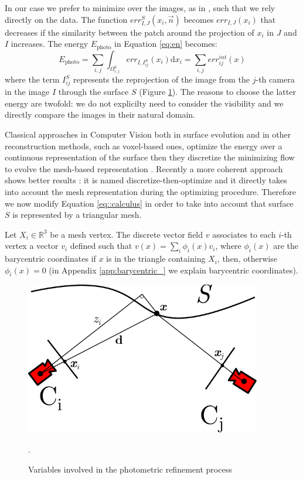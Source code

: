 In our case we prefer to minimize  over the images, as in \cite{pons2007multi}, such that we rely directly on the data.
The function $err^S_{I, J}(x_i,\overrightarrow{n})$ becomes 
$err_{I, J}(x_i)$ that decreases if the similarity between the patch around the projection of $x_i$ in  $J$ and $I$ increases.
The energy $E_{\textrm{photo}}$ in Equation \eqref{eq:en} becomes:
\begin{equation}
\label{eq:energy_photo}
  E_{\textrm{photo}} = \sum_{i,j}\int_{\Omega^{\textrm{S}}_{i,j}} err_{I, I_{ij}^{\mathit{S}}}(x_i)\textrm{d}x_i = \sum_{i,j} \mathit{err}^{int}_{ij}(x)
\end{equation}
where the term $I_{ij}^{\mathit{S}}$ represents the reprojection of the image from the $j$-th camera in the image $I$ through the surface $\mathit{S}$
(Figure \ref{fig:cameraproj}).
The reasons to choose the latter energy are twofold: we do not explicilty need to consider the visibility and we directly compare the images in their natural domain.

Classical approaches in Computer Vision both in surface evolution and in other reconstruction methods, such as voxel-based ones, optimize the energy over a continuous representation of the surface then they discretize the minimizing flow to evolve the mesh-based representation \cite{pons2007multi,faugeras2002variational}. Recently a more coherent approach shows better results \cite{vu_et_al_2012,delaunoy_et_al_08}: it is named discretize-then-optimize and it directly takes into account the mesh representation during the optimizing procedure. 
Therefore we now modify Equation \eqref{eq::calculus} in order to take into account that  surface $\mathit{S}$ is represented by a triangular mesh.

Let $X_i \in \mathbb{R}^3$ be a mesh vertex. The discrete vector field $v$ associates to each $i$-th vertex a vector $v_i$ defined such that $v(x) = \sum_i \phi_i(x) v_i$, where $\phi_i(x)$ are the barycentric coordinates if $x$ is in the triangle containing $X_i$, then,  otherwise $\phi_i(x) = 0$ (in Appendix \ref{app:barycentric_} we explain barycentric coordinates).


\begin{figure}[t]
\centering
\includegraphics[width=0.92\textwidth]{./img/ch-incr-dens/cameproj}
\caption{Variables involved in the photometric refinement process}.
\label{fig:cameraproj}
\end{figure}

